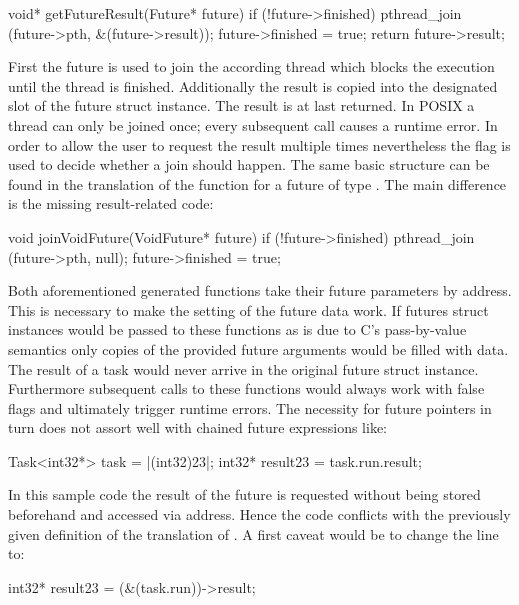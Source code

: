 \begin{ccode}
void* getFutureResult(Future* future) { 
  if (!future->finished) { 
    pthread_join (future->pth, &(future->result)); 
    future->finished = true; 
  } 
  return future->result; 
} 
\end{ccode}
First the future is used to join the according thread which blocks the execution until the thread is finished. Additionally the result is copied into the designated slot of the future struct instance. The result is at last returned. In POSIX a thread can only be joined once; every subsequent call causes a runtime error. In order to allow the user to request the result multiple times nevertheless the  flag is used to decide whether a join should happen. The same basic structure can be found in the translation of the  function for a future of type . The main difference is the missing result-related code:
\begin{ccode}
void joinVoidFuture(VoidFuture* future) { 
  if (!future->finished) { 
    pthread_join (future->pth, null); 
    future->finished = true; 
  }
}
\end{ccode}
Both aforementioned generated functions take their future parameters by address. This is necessary to make the setting of the future data work. If futures struct instances would be passed to these functions as is due to C's pass-by-value semantics only copies of the provided future arguments would be filled with data. The result of a task would never arrive in the original future struct instance. Furthermore subsequent calls to these functions would always work with false  flags and ultimately trigger runtime errors. The necessity for future pointers in turn does not assort well with chained future expressions like:

\begin{ccode}
Task<int32*> task = |(int32)23|;
int32* result23 = task.run.result;
\end{ccode}

In this sample code the result of the future is requested without being stored beforehand and accessed via address. Hence the code conflicts with the previously given definition of the translation of . A first caveat would be to change the line to:

\begin{ccode}
int32* result23 = (&(task.run))->result;
\end{ccode}

